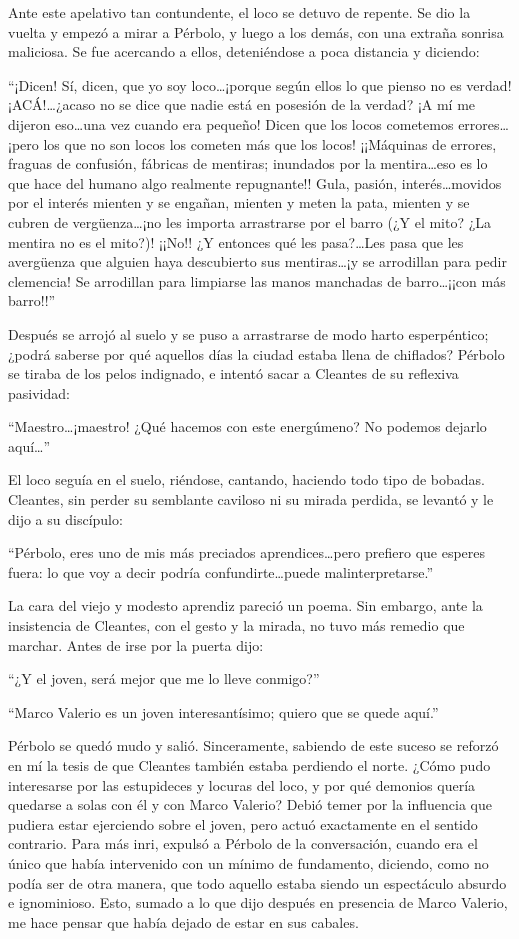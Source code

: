 \documentclass[11pt,openany]{book}
\begin{document}
Ante este apelativo tan contundente, el loco se detuvo de repente. Se dio la vuelta y empezó a mirar a Pérbolo, y luego a los demás, con una extraña sonrisa maliciosa. Se fue acercando a ellos, deteniéndose a poca distancia y diciendo: 

“¡Dicen! Sí, dicen, que yo soy loco\dots ¡porque según ellos lo que pienso no es verdad! ¡ACÁ!\dots ¿acaso no se dice que nadie está en posesión de la verdad? ¡A mí me dijeron eso\dots una vez cuando era pequeño! Dicen que los locos cometemos errores\dots ¡pero los que no son locos los cometen más que los locos! ¡¡Máquinas de errores, fraguas de confusión, fábricas de mentiras; inundados por la mentira\dots eso es lo que hace del humano algo realmente repugnante!! Gula, pasión, interés\dots movidos por el interés mienten y se engañan, mienten y meten la pata, mienten y se cubren de vergüenza\dots ¡no les importa arrastrarse por el barro (¿Y el mito? ¿La mentira no es el mito?)! ¡¡No!! ¿Y entonces qué les pasa?\dots Les pasa que les avergüenza que alguien haya descubierto sus mentiras\dots ¡y se arrodillan para pedir clemencia! Se arrodillan para limpiarse las manos manchadas de barro\dots ¡¡con más barro!!” 

Después se arrojó al suelo y se puso a arrastrarse de modo harto esperpéntico; ¿podrá saberse por qué aquellos días la ciudad estaba llena de chiflados?  Pérbolo se tiraba de los pelos indignado, e intentó sacar a Cleantes de su reflexiva pasividad: 

“Maestro\dots ¡maestro! ¿Qué hacemos con este energúmeno? No podemos dejarlo aquí\dots” 

El loco seguía en el suelo, riéndose, cantando, haciendo todo tipo de bobadas. Cleantes, sin perder su semblante caviloso ni su mirada perdida, se levantó y le dijo a su discípulo: 

“Pérbolo, eres uno de mis más preciados aprendices\dots pero prefiero que esperes fuera: lo que voy a decir podría confundirte\dots puede malinterpretarse.” 

La cara del viejo y modesto aprendiz pareció un poema. Sin embargo, ante la insistencia de Cleantes, con el gesto y la mirada, no tuvo más remedio que marchar. Antes de irse por la puerta dijo: 

“¿Y el joven, será mejor que me lo lleve conmigo?” 

“Marco Valerio es un joven interesantísimo; quiero que se quede aquí.” 

Pérbolo se quedó mudo y salió. Sinceramente, sabiendo de este suceso se reforzó en mí la tesis de que Cleantes también estaba perdiendo el norte. ¿Cómo pudo interesarse por las estupideces y locuras del loco, y por qué demonios quería quedarse a solas con él y con Marco Valerio? Debió temer por la influencia que pudiera estar ejerciendo sobre el joven, pero actuó exactamente en el sentido contrario. Para más inri, expulsó a Pérbolo de la conversación, cuando era el único que había intervenido con un mínimo de fundamento, diciendo, como no podía ser de otra manera, que todo aquello estaba siendo un espectáculo absurdo e ignominioso. Esto, sumado a lo que dijo después en presencia de Marco Valerio, me hace pensar que había dejado de estar en sus cabales. 
\end{document}
